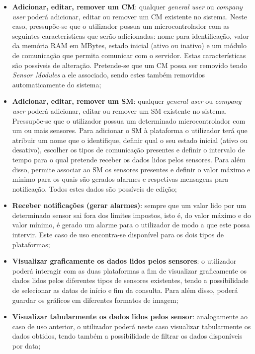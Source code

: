 \begin{itemize}
	
	\item \textbf{Adicionar, editar, remover um \acl{CM}}: qualquer \textit{general user} ou \textit{company user} poderá adicionar, editar ou remover um \acl{CM} existente no sistema. Neste caso, pressupõe-se que o utilizador possua um microcontrolador com as seguintes características que serão  adicionadas: nome para identificação, valor da memória \ac{RAM} em MBytes, estado inicial (ativo ou inativo) e um módulo de comunicação que permita comunicar com o servidor. Estas características são possíveis de  alteração. Pretende-se que um \acl{CM} possa ser removido tendo \textit{Sensor Modules} a ele associado, sendo estes também removidos automaticamente do sistema;


	\item \textbf{Adicionar, editar, remover um \acl{SM}}: qualquer \textit{general user} ou \textit{company user} poderá adicionar, editar ou remover um \acl{SM} existente no sistema. Pressupõe-se que o utilizador possua um determinado microcontrolador com um ou mais sensores. Para adicionar o \acl{SM} à plataforma o utilizador terá que atribuir um nome que o identifique, definir qual o seu estado inicial (ativo ou desativo), escolher os tipos de comunicação presentes e definir o intervalo de tempo para o qual pretende receber os dados lidos pelos sensores. Para além disso, permite associar ao \acl{SM} os sensores presentes e definir o valor máximo e mínimo para os quais são gerados alarmes e respetivas mensagens para notificação. Todos estes dados são possíveis de edição; 
	
	\item \textbf{Receber notificações (gerar alarmes)}: sempre que um valor lido por um determinado sensor sai fora dos limites impostos, isto é, do valor máximo e do valor mínimo, é gerado um alarme para o utilizador de modo a que este possa intervir. Este caso de uso encontra-se disponível para os dois tipos de plataformas;
	
	
	\item \textbf{Visualizar graficamente os dados lidos pelos sensores}: o utilizador poderá interagir com as duas plataformas a fim de visualizar graficamente os dados lidos pelos diferentes tipos de sensores existentes, tendo a possibilidade de selecionar as datas de início e fim da consulta. Para além disso, poderá guardar os gráficos em diferentes formatos de imagem;
	
	\item \textbf{Visualizar tabularmente os dados lidos pelos sensor}: analogamente ao caso de uso anterior, o utilizador poderá neste caso visualizar tabularmente os dados obtidos, tendo também a possibilidade de filtrar os dados disponíveis por data; 
	

\end{itemize}
